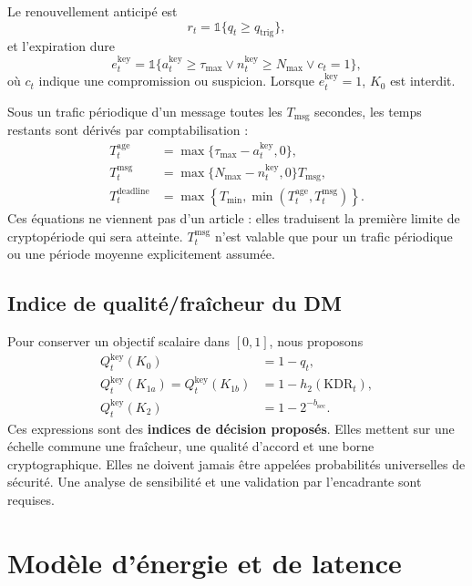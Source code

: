 \documentclass[conference,a4paper]{IEEEtran}
\newcommand{\Rkey}{Q^{\mathrm{key}}}
\newcommand{\KDR}{\mathrm{KDR}}
\begin{document}
Le renouvellement anticipé est
\begin{equation}
    r_t=\mathbb 1\{q_t\geq q_{\mathrm{trig}}\},
    \label{eq:key-renew-trigger}
\end{equation}
et l'expiration dure
\begin{equation}
    e_t^{\mathrm{key}}=\mathbb 1\{a_t^{\mathrm{key}}\geq\tau_{\max}
    \lor n_t^{\mathrm{key}}\geq N_{\max}\lor c_t=1\},
    \label{eq:key-expired}
\end{equation}
où $c_t$ indique une compromission ou suspicion. Lorsque $e_t^{\mathrm{key}}=1$, $K_0$ est interdit.

Sous un trafic périodique d'un message toutes les $T_{\mathrm{msg}}$ secondes, les temps restants sont dérivés par comptabilisation :
\begin{align}
T_t^{\mathrm{age}}&=\max\{\tau_{\max}-a_t^{\mathrm{key}},0\},
\label{eq:deadline-age}\\
T_t^{\mathrm{msg}}&=\max\{N_{\max}-n_t^{\mathrm{key}},0\}T_{\mathrm{msg}},
\label{eq:deadline-msg}\\
T_t^{\mathrm{deadline}}&=\max\left\{T_{\min},
\min(T_t^{\mathrm{age}},T_t^{\mathrm{msg}})\right\}.
\label{eq:key-deadline}
\end{align}
Ces équations ne viennent pas d'un article : elles traduisent la première limite de cryptopériode qui sera atteinte. $T_t^{\mathrm{msg}}$ n'est valable que pour un trafic périodique ou une période moyenne explicitement assumée.

\subsection{Indice de qualité/fraîcheur du DM}
Pour conserver un objectif scalaire dans $[0,1]$, nous proposons
\begin{align}
    \Rkey_t(K_0)&=1-q_t,
    \label{eq:qkey-k0}\\
    \Rkey_t(K_{1a})=\Rkey_t(K_{1b})&=1-h_2(\KDR_t),
    \label{eq:qkey-k1}\\
    \Rkey_t(K_2)&=1-2^{-b_{\mathrm{sec}}}.
    \label{eq:qkey-k2}
\end{align}
Ces expressions sont des \textbf{indices de décision proposés}. Elles mettent sur une échelle commune une fraîcheur, une qualité d'accord et une borne cryptographique. Elles ne doivent jamais être appelées probabilités universelles de sécurité. Une analyse de sensibilité et une validation par l'encadrante sont requises.


\section{Modèle d'énergie et de latence}
\label{sec:energy-latency}
\end{document}
